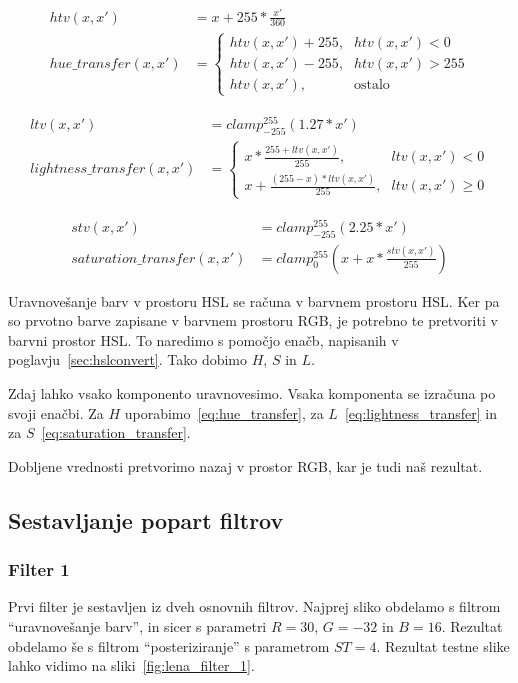\documentclass[a4paper, 12pt]{book}
\begin{document}
\begin{align}
htv(x, x') &= x + 255 * \frac{x'}{360} \nonumber \\
hue\_transfer(x, x') &=
\begin{cases}
    htv(x, x') + 255 \text{,}& htv(x, x') < 0 \\
    htv(x, x') - 255 \text{,}& htv(x, x') > 255 \\
    htv(x, x') \text{,}& \text{ostalo}
\end{cases} \label{eq:hue_transfer}
\end{align}

\begin{align}
ltv(x, x') &= clamp_{-255}^{255}(1.27 * x') \nonumber \\
lightness\_transfer(x, x') &=
\begin{cases}
    x * \frac{255 + ltv(x, x')}{255} \text{,}& ltv(x, x') < 0 \\
    x + \frac{(255 - x) * ltv(x, x')}{255} \text{,}& ltv(x, x') \geq 0
\end{cases} \label{eq:lightness_transfer}
\end{align}

\begin{align}
stv(x, x') &= clamp_{-255}^{255}(2.25 * x') \nonumber \\
saturation\_transfer(x, x') &= clamp_{0}^{255}(x + x * \frac{stv(x, x')}{255}) \label{eq:saturation_transfer}
\end{align}

Uravnovešanje barv v prostoru HSL se računa v barvnem prostoru HSL. Ker pa so
prvotno barve zapisane v barvnem prostoru RGB, je potrebno te pretvoriti v
barvni prostor HSL. To naredimo s pomočjo enačb, napisanih v
poglavju~\ref{sec:hslconvert}. Tako dobimo $H$, $S$ in $L$.

Zdaj lahko vsako komponento uravnovesimo. Vsaka komponenta se izra\-ču\-na po
svoji enačbi. Za $H$ uporabimo~\eqref{eq:hue_transfer}, za
$L$~\eqref{eq:lightness_transfer} in za $S$~\eqref{eq:saturation_transfer}.

Dobljene vrednosti pretvorimo nazaj v prostor RGB, kar je tudi naš rezultat.


\subsection{Sestavljanje popart filtrov}
\label{sec:obdelavaSlikSestavljanjePopArt}

\subsubsection*{Filter 1}
Prvi filter je sestavljen iz dveh osnovnih filtrov. Najprej sliko obdelamo s
filtrom ``uravnovešanje barv'', in sicer s parametri $R = 30$, $G = -32$ in
$B = 16$. Rezultat obdelamo še s filtrom ``posteriziranje'' s parametrom
$ST =4$. Rezultat testne slike lahko vidimo na sliki~\ref{fig:lena_filter_1}.
\end{document}
